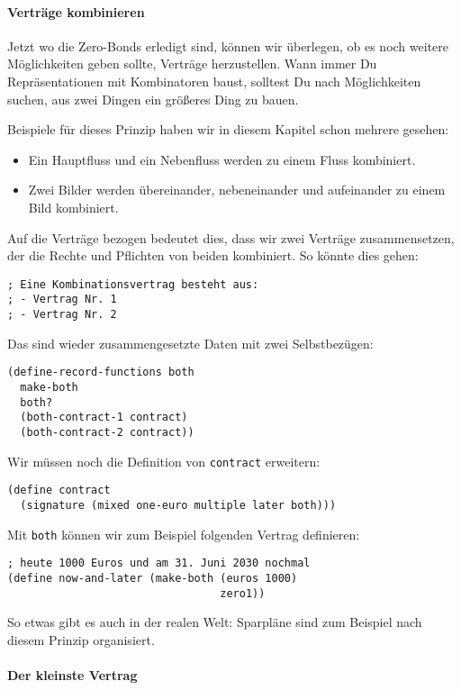 \paragraph{Verträge kombinieren}

Jetzt wo die Zero-Bonds erledigt sind, können wir überlegen, ob es
noch weitere Möglichkeiten geben sollte, Verträge herzustellen.  Wann
immer Du Repräsentationen mit Kombinatoren baust, solltest Du nach
Möglichkeiten suchen, aus zwei Dingen ein größeres Ding zu bauen.

Beispiele für dieses Prinzip haben wir in diesem Kapitel schon mehrere
gesehen:
%
\begin{itemize}
\item Ein Hauptfluss und ein Nebenfluss werden zu einem Fluss
  kombiniert.
\item Zwei Bilder werden übereinander, nebeneinander und aufeinander
  zu einem Bild kombiniert.
\end{itemize}
%
Auf die Verträge bezogen bedeutet dies, dass wir zwei Verträge
zusammensetzen, der die Rechte und Pflichten von beiden kombiniert.
So könnte dies gehen:
%
\begin{lstlisting}
; Eine Kombinationsvertrag besteht aus:
; - Vertrag Nr. 1
; - Vertrag Nr. 2
\end{lstlisting}
%
Das sind wieder zusammengesetzte Daten mit zwei Selbstbezügen:
%
\begin{lstlisting}
(define-record-functions both
  make-both
  both?
  (both-contract-1 contract)
  (both-contract-2 contract))
\end{lstlisting}
%
Wir müssen noch die Definition von \lstinline{contract} erweitern:
%
\begin{lstlisting}
(define contract
  (signature (mixed one-euro multiple later both)))
\end{lstlisting}
%
Mit \lstinline{both} können wir zum Beispiel folgenden Vertrag definieren:

\begin{lstlisting}
; heute 1000 Euros und am 31. Juni 2030 nochmal
(define now-and-later (make-both (euros 1000)
                                 zero1))
\end{lstlisting}
%
So etwas gibt es auch in der realen Welt: Sparpläne sind zum Beispiel
nach diesem Prinzip organisiert.

\paragraph{Der kleinste Vertrag}

